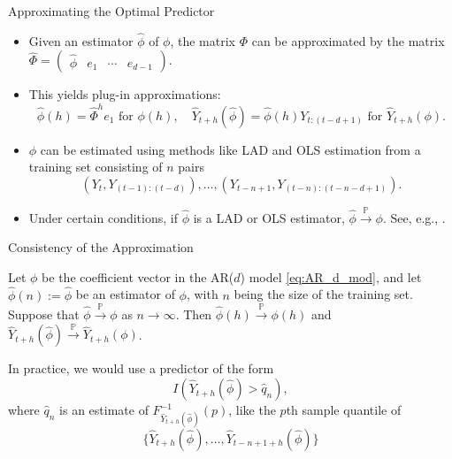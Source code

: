\documentclass{beamer}
\def\P{\mathbb P}
\newcommand{\AROptPred}[3]{\hat{Y}_{#1 + #2}(#3)}
\newcommand{\approxAROptPred}[3]{\hat{Y}_{#1 + #2}(\hat{#3})}
\begin{document}
\begin{frame}{Approximating the Optimal Predictor}
    \begin{itemize}
        \item Given an estimator $\hat{\phi}$ of $\phi$, the matrix $\Phi$ can be approximated by the matrix $\hat{\Phi} = (\begin{matrix} \hat{\phi} & e_1 & \cdots & e_{d - 1} \end{matrix})$.
        \item This yields plug-in approximations:
        \[
        \hat{\phi}(h) = \hat{\Phi}^h e_1 \text{ for } \phi(h), \quad \approxAROptPred{t}{h}{\phi} = \hat{\phi}(h)Y_{t:(t - d + 1)} \text{ for } \AROptPred{t}{h}{\phi}.
        \]
        \item $\phi$ can be estimated using methods like LAD and OLS estimation from a training set consisting of $n$ pairs
        \[
        (Y_t, Y_{(t - 1):(t - d)}), \ldots, (Y_{t - n + 1}, Y_{(t - n):(t - n - d + 1)}).
        \]
        \item Under certain conditions, if $\hat{\phi}$ is a LAD or OLS estimator, $\hat{\phi} \xrightarrow{\P} \phi$. See, e.g., \cite{davis1992mest}.
    \end{itemize}
\end{frame}

\begin{frame}{Consistency of the Approximation}
    \begin{theorem}
        Let $\phi$ be the coefficient vector in the AR($d$) model \eqref{eq:AR_d_mod}, and let $\hat{\phi}(n) := \hat{\phi}$ be an estimator of $\phi$, with $n$ being the size of the training set. Suppose that $\hat{\phi} \xrightarrow{\P} \phi$ as $n \to \infty$. Then $\hat{\phi}(h) \xrightarrow{\P} \phi(h)$ and $\approxAROptPred{t}{h}{\phi} \xrightarrow{\P} \AROptPred{t}{h}{\phi}$.
    \end{theorem}
    In practice, we would use a predictor of the form
    \[
    I(\approxAROptPred{t}{h}{\phi} > \hat{q}_n),
    \]
    where $\hat{q}_n$ is an estimate of $F_{\approxAROptPred{t}{h}{\phi}}^{-1}(p)$, like the $p$th sample quantile of
    \[
    \{\approxAROptPred{t}{h}{\phi}, \ldots, \approxAROptPred{t - n + 1}{h}{\phi}\}
    \]
\end{frame}
\end{document}
